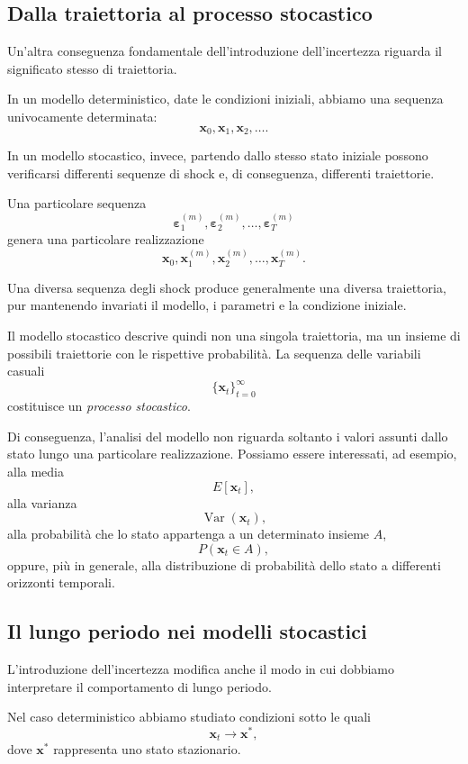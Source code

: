 \documentclass{book}
\begin{document}
\subsection{Dalla traiettoria al processo stocastico}

Un'altra conseguenza fondamentale dell'introduzione dell'incertezza riguarda il significato stesso di traiettoria.

In un modello deterministico, date le condizioni iniziali, abbiamo una sequenza univocamente determinata:
\[
\mathbf{x}_0,\mathbf{x}_1,\mathbf{x}_2,\ldots.
\]

In un modello stocastico, invece, partendo dallo stesso stato iniziale possono verificarsi differenti sequenze di shock e, di conseguenza, differenti traiettorie.

Una particolare sequenza
\[
\boldsymbol{\varepsilon}_1^{(m)},
\boldsymbol{\varepsilon}_2^{(m)},\ldots,
\boldsymbol{\varepsilon}_T^{(m)}
\]
genera una particolare realizzazione
\[
\mathbf{x}_0,
\mathbf{x}_1^{(m)},
\mathbf{x}_2^{(m)},\ldots,
\mathbf{x}_T^{(m)}.
\]

Una diversa sequenza degli shock produce generalmente una diversa traiettoria, pur mantenendo invariati il modello, i parametri e la condizione iniziale.

Il modello stocastico descrive quindi non una singola traiettoria, ma un insieme di possibili traiettorie con le rispettive probabilità. La sequenza delle variabili casuali
\[
\{\mathbf{x}_t\}_{t=0}^{\infty}
\]
costituisce un \emph{processo stocastico}.

Di conseguenza, l'analisi del modello non riguarda soltanto i valori assunti dallo stato lungo una particolare realizzazione. Possiamo essere interessati, ad esempio, alla media
\[
E[\mathbf{x}_t],
\]
alla varianza
\[
\operatorname{Var}(\mathbf{x}_t),
\]
alla probabilità che lo stato appartenga a un determinato insieme $A$,
\[
P(\mathbf{x}_t\in A),
\]
oppure, più in generale, alla distribuzione di probabilità dello stato a differenti orizzonti temporali.

\subsection{Il lungo periodo nei modelli stocastici}

L'introduzione dell'incertezza modifica anche il modo in cui dobbiamo interpretare il comportamento di lungo periodo.

Nel caso deterministico abbiamo studiato condizioni sotto le quali
\[
\mathbf{x}_t\rightarrow\mathbf{x}^*,
\]
dove $\mathbf{x}^*$ rappresenta uno stato stazionario.
\end{document}
